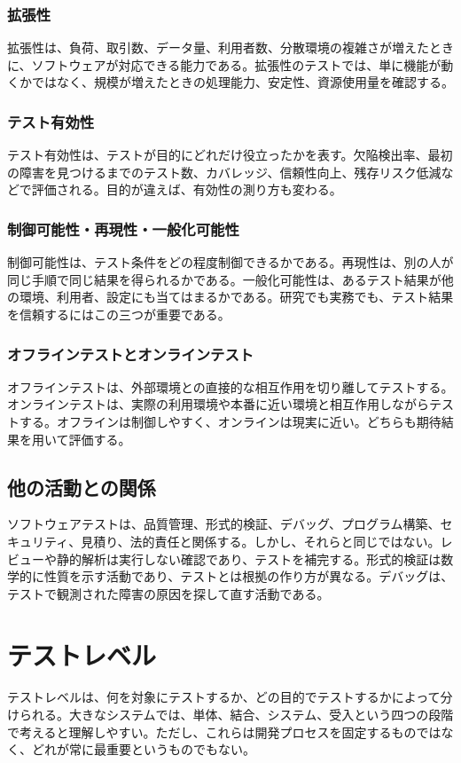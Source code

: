 \documentclass[uplatex,dvipdfmx,a4paper,11pt,nomag]{jsarticle}
\begin{document}
\subsubsection{拡張性}
拡張性は、負荷、取引数、データ量、利用者数、分散環境の複雑さが増えたときに、ソフトウェアが対応できる能力である。拡張性のテストでは、単に機能が動くかではなく、規模が増えたときの処理能力、安定性、資源使用量を確認する。

\subsubsection{テスト有効性}
テスト有効性は、テストが目的にどれだけ役立ったかを表す。欠陥検出率、最初の障害を見つけるまでのテスト数、カバレッジ、信頼性向上、残存リスク低減などで評価される。目的が違えば、有効性の測り方も変わる。

\subsubsection{制御可能性・再現性・一般化可能性}
制御可能性は、テスト条件をどの程度制御できるかである。再現性は、別の人が同じ手順で同じ結果を得られるかである。一般化可能性は、あるテスト結果が他の環境、利用者、設定にも当てはまるかである。研究でも実務でも、テスト結果を信頼するにはこの三つが重要である。

\subsubsection{オフラインテストとオンラインテスト}
オフラインテストは、外部環境との直接的な相互作用を切り離してテストする。オンラインテストは、実際の利用環境や本番に近い環境と相互作用しながらテストする。オフラインは制御しやすく、オンラインは現実に近い。どちらも期待結果を用いて評価する。

\subsection{他の活動との関係}
ソフトウェアテストは、品質管理、形式的検証、デバッグ、プログラム構築、セキュリティ、見積り、法的責任と関係する。しかし、それらと同じではない。レビューや静的解析は実行しない確認であり、テストを補完する。形式的検証は数学的に性質を示す活動であり、テストとは根拠の作り方が異なる。デバッグは、テストで観測された障害の原因を探して直す活動である。

\section{テストレベル}
テストレベルは、何を対象にテストするか、どの目的でテストするかによって分けられる。大きなシステムでは、単体、結合、システム、受入という四つの段階で考えると理解しやすい。ただし、これらは開発プロセスを固定するものではなく、どれが常に最重要というものでもない。
\end{document}
